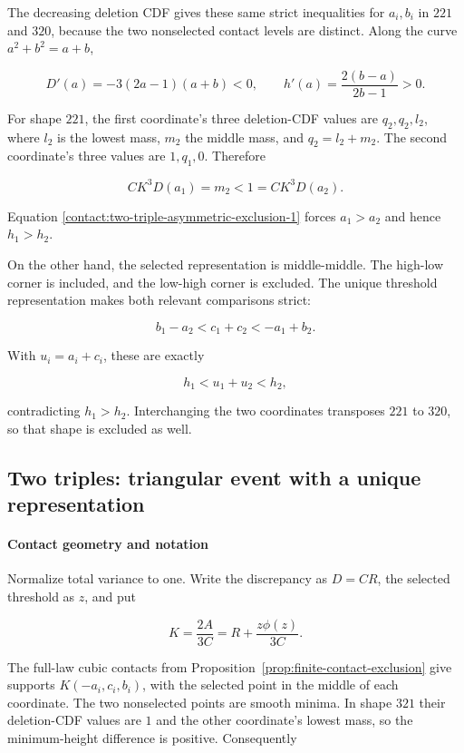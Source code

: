 The decreasing deletion CDF gives these same strict inequalities for
$a_i,b_i$ in $221$ and $320$, because the two nonselected contact levels
are distinct. Along the curve $a^2+b^2=a+b$,

\[
 D'(a)=-3(2a-1)(a+b)<0,
 \qquad
 h'(a)=\frac{2(b-a)}{2b-1}>0.
\tag{B.19.1}\label{contact:two-triple-asymmetric-exclusion-1}
\]

For shape $221$, the first coordinate's three deletion-CDF values are
$q_2,q_2,l_2$, where $l_2$ is the lowest mass, $m_2$ the middle mass,
and $q_2=l_2+m_2$. The second coordinate's three values are
$1,q_1,0$. Therefore

\[
 C K^3D(a_1)=m_2<1=C K^3D(a_2).
\]

Equation \eqref{contact:two-triple-asymmetric-exclusion-1} forces $a_1>a_2$ and hence $h_1>h_2$.

On the other hand, the selected representation is middle-middle. The high-low
corner is included, and the low-high corner is excluded. The unique threshold representation
makes both relevant comparisons strict:

\[
 b_1-a_2<c_1+c_2<-a_1+b_2.
\]

With $u_i=a_i+c_i$, these are exactly

\[
 h_1<u_1+u_2<h_2,
\]

contradicting $h_1>h_2$. Interchanging the two coordinates transposes
$221$ to $320$, so that shape is excluded as well.
\subsection{Two triples: triangular event with a unique representation}\label{contact:two-triple-triangle-exclusion}


\paragraph{Contact geometry and notation}

Normalize total variance to one. Write the discrepancy as $D=C R$, the
selected threshold as $z$, and put

\[
 K=\frac{2A}{3C}=R+\frac{z\phi(z)}{3C}.
\]

The full-law cubic contacts from
Proposition~\ref{prop:finite-contact-exclusion}
give supports $K(-a_i,c_i,b_i)$, with the selected point in the middle
of each coordinate. The two nonselected points are smooth minima.
In shape $321$ their deletion-CDF values are $1$ and the other
coordinate's lowest mass, so the minimum-height difference is positive.
Consequently

